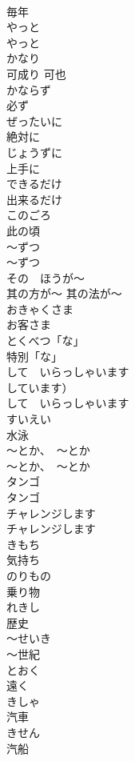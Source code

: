 \documentclass[8pt]{extreport}
\begin{document}
\begin{CJK}{UTF8}{min}
\\	毎年	
\\	やっと	
\\	やっと	
\\	かなり	
\\	可成り 可也		
\\	かならず	
\\	必ず	
\\	ぜったいに	
\\	絶対に	
\\	じょうずに	
\\	上手に		
\\	できるだけ	
\\	出来るだけ	
\\	このごろ	
\\	此の頃		
\\	〜ずつ	
\\	〜ずつ		
\\	その　ほうが〜	
\\	其の方が〜 其の法が〜		
\\	おきゃくさま	
\\	お客さま		
\\	とくべつ「な」	
\\	特別「な」		
\\	して　いらっしゃいます	
\\	しています） 
\\	して　いらっしゃいます		
\\	すいえい	
\\	水泳		
\\	〜とか、　〜とか	
\\	〜とか、　〜とか		
\\	タンゴ	
\\	タンゴ		
\\	チャレンジします	
\\	チャレンジします		
\\	きもち	
\\	気持ち		
\\	のりもの	
\\	乗り物		
\\	れきし	
\\	歴史		
\\	〜せいき	
\\	〜世紀		
\\	とおく	
\\	遠く		
\\	きしゃ	
\\	汽車		
\\	きせん	
\\	汽船		

\end{CJK}
\end{document}
